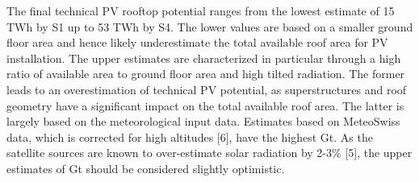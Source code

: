 The final technical PV rooftop potential ranges from the lowest estimate of 15 TWh by S1 up to 53 TWh by S4. The lower values are based on a smaller ground floor area and hence likely underestimate the total available roof area for PV installation. The upper estimates are characterized in particular through a high ratio of available area to ground floor area and high tilted radiation. The former leads to an overestimation of technical PV potential, as superstructures and roof geometry have a significant impact on the total available roof area. The latter is largely based on the meteorological input data. Estimates based on MeteoSwiss data, which is corrected for high altitudes [6], have the highest Gt. As the satellite sources are known to over-estimate solar radiation by 2-3\% [5], the upper estimates of Gt should be considered slightly optimistic.


